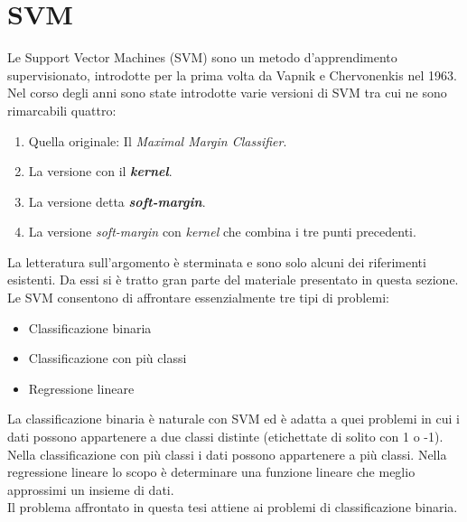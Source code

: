 \section{SVM}
Le Support Vector Machines (\ac{SVM}) sono un metodo d'apprendimento supervisionato, introdotte per la prima volta da Vapnik e Chervonenkis nel 1963. Nel corso degli anni sono state introdotte varie versioni di \ac{SVM} tra cui ne sono rimarcabili quattro:
\begin{enumerate}
\item Quella originale: Il \textit{Maximal Margin Classifier}.
\item La versione con il \textbf{\textit{kernel}}.
\item La versione detta \textbf{\textit{soft-margin}}.
\item La versione \textit{soft-margin} con \textit{kernel} che combina i tre punti precedenti.
\end{enumerate}
La letteratura sull'argomento è sterminata e \cite{Osuna97} \cite{Burges98} \cite{Ng}  sono solo alcuni dei riferimenti esistenti. Da essi si è tratto gran parte del materiale presentato in questa sezione.
 Le \ac{SVM} consentono di affrontare essenzialmente tre tipi di problemi:
\begin{itemize}
\item Classificazione binaria
\item Classificazione con più classi
\item Regressione lineare
\end{itemize}   

La classificazione binaria è naturale con \ac{SVM} ed è adatta a quei problemi in cui i dati possono appartenere a due classi distinte (etichettate di solito con 1 o -1).\\
Nella classificazione con più classi i dati possono appartenere a più classi.
Nella regressione lineare lo scopo è determinare una funzione lineare che meglio approssimi  un insieme di dati.\\
Il problema affrontato in questa tesi attiene ai problemi di classificazione binaria.

